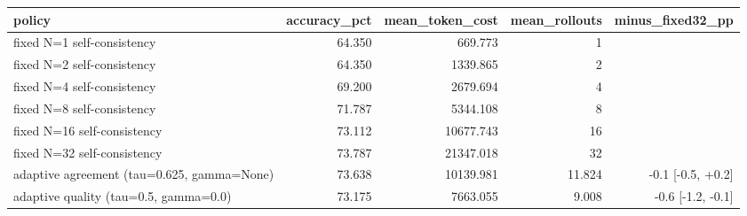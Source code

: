 \begin{tabular}{lrrrr}
\toprule
policy & accuracy\_pct & mean\_token\_cost & mean\_rollouts & minus\_fixed32\_pp \\
\midrule
fixed N=1 self-consistency & 64.350 & 669.773 & 1 &  \\
fixed N=2 self-consistency & 64.350 & 1339.865 & 2 &  \\
fixed N=4 self-consistency & 69.200 & 2679.694 & 4 &  \\
fixed N=8 self-consistency & 71.787 & 5344.108 & 8 &  \\
fixed N=16 self-consistency & 73.112 & 10677.743 & 16 &  \\
fixed N=32 self-consistency & 73.787 & 21347.018 & 32 &  \\
adaptive agreement (tau=0.625, gamma=None) & 73.638 & 10139.981 & 11.824 & -0.1 [-0.5, +0.2] \\
adaptive quality (tau=0.5, gamma=0.0) & 73.175 & 7663.055 & 9.008 & -0.6 [-1.2, -0.1] \\
\bottomrule
\end{tabular}
